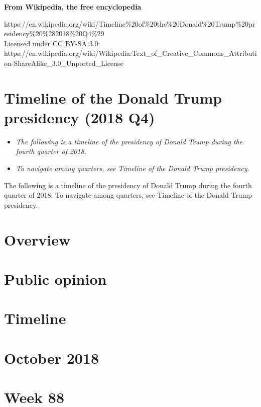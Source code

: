 \textbf{From Wikipedia, the free encyclopedia}

https://en.wikipedia.org/wiki/Timeline\%20of\%20the\%20Donald\%20Trump\%20presidency\%20\%282018\%20Q4\%29\\
Licensed under CC BY-SA 3.0:\\
https://en.wikipedia.org/wiki/Wikipedia:Text\_of\_Creative\_Commons\_Attribution-ShareAlike\_3.0\_Unported\_License

\section{Timeline of the Donald Trump presidency (2018
Q4)}\label{timeline-of-the-donald-trump-presidency-2018-q4}

\begin{itemize}
\item
  \emph{The following is a timeline of the presidency of Donald Trump
  during the fourth quarter of 2018.}
\item
  \emph{To navigate among quarters, see Timeline of the Donald Trump
  presidency.}
\end{itemize}

The following is a timeline of the presidency of Donald Trump during the
fourth quarter of 2018. To navigate among quarters, see Timeline of the
Donald Trump presidency.

\section{Overview}\label{overview}

\section{Public opinion}\label{public-opinion}

\section{Timeline}\label{timeline}

\section{October 2018}\label{october-2018}

\section{Week 88}\label{week-88}

